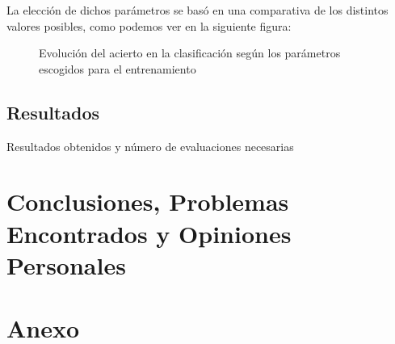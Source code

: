 \documentclass[12pt]{article}
\begin{document}
La elección de dichos parámetros se basó en una comparativa de los distintos
valores posibles, como podemos ver en la siguiente figura:

\begin{figure}[h]
    \center
    \caption{Evolución del acierto en la clasificación según los parámetros escogidos para el entrenamiento}
    \label{}
\end{figure}

\subsection{Resultados}

Resultados obtenidos y 
número de evaluaciones
necesarias


\newpage


\newpage

\section{Conclusiones, Problemas Encontrados y Opiniones Personales}

\section{Anexo}



\end{document}
